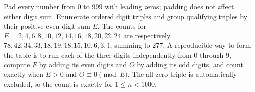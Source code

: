 Pad every number from 0 to 999 with leading zeros; padding does not affect either digit sum. Enumerate ordered digit triples and group qualifying triples by their positive even-digit sum $E$. The counts for $E=2,4,6,8,10,12,14,16,18,20,22,24$ are respectively $78,42,34,33,18,19,18,15,10,6,3,1$, summing to $\boxed{277}$. A reproducible way to form the table is to run each of the three digits independently from 0 through 9, compute $E$ by adding its even digits and $O$ by adding its odd digits, and count exactly when $E>0$ and $O\equiv0\pmod E$. The all-zero triple is automatically excluded, so the count is exactly for $1\le n<1000$.
